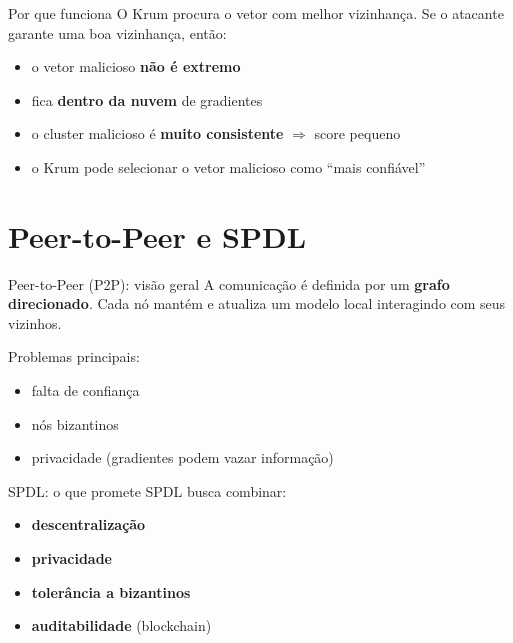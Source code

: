 \documentclass[aspectratio=169]{beamer}
\begin{document}
\begin{frame}{Por que funciona}
  O Krum procura o vetor com melhor vizinhança.
  Se o atacante garante uma boa vizinhança, então:

  \vspace{0.5em}
  \begin{itemize}
    \item o vetor malicioso \textbf{não é extremo}
    \item fica \textbf{dentro da nuvem} de gradientes
    \item o cluster malicioso é \textbf{muito consistente} \(\Rightarrow\) score pequeno
    \item o Krum pode selecionar o vetor malicioso como “mais confiável”
  \end{itemize}
\end{frame}

\section{Peer-to-Peer e SPDL}

\begin{frame}{Peer-to-Peer (P2P): visão geral}
  A comunicação é definida por um \textbf{grafo direcionado}.
  Cada nó mantém e atualiza um modelo local interagindo com seus vizinhos.

  \vspace{0.5em}
  Problemas principais:
  \begin{itemize}
    \item falta de confiança
    \item nós bizantinos
    \item privacidade (gradientes podem vazar informação)
  \end{itemize}
\end{frame}

\begin{frame}{SPDL: o que promete}
  SPDL busca combinar:
  \begin{itemize}
    \item \textbf{descentralização} 
    \item \textbf{privacidade} 
    \item \textbf{tolerância a bizantinos} 
    \item \textbf{auditabilidade} (blockchain)
  \end{itemize}
\end{frame}
\end{document}
